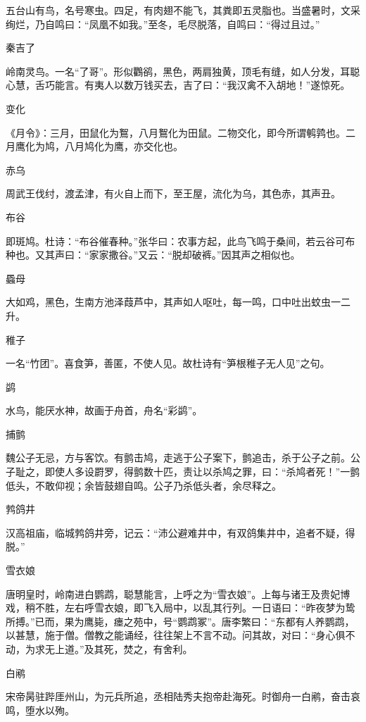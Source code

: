 \documentclass[a4paper,12pt,UTF8,twoside]{ctexbook}
\begin{document}
    五台山有鸟，名号寒虫。四足，有肉翅不能飞，其粪即五灵脂也。当盛暑时，文采绚烂，乃自鸣曰：“凤凰不如我。”至冬，毛尽脱落，自鸣曰：“得过且过。”
    
    秦吉了
    
    岭南灵鸟。一名“了哥”。形似鸜鹆，黑色，两肩独黄，顶毛有缝，如人分发，耳聪心慧，舌巧能言。有夷人以数万钱买去，吉了曰：“我汉禽不入胡地！”遂惊死。
    
    变化
    
    《月令》：三月，田鼠化为鴽，八月鴽化为田鼠。二物交化，即今所谓鹌鹑也。二月鹰化为鸠，八月鸠化为鹰，亦交化也。
    
    赤乌
    
    周武王伐纣，渡孟津，有火自上而下，至王屋，流化为乌，其色赤，其声丑。
    
    布谷
    
    即斑鸠。杜诗：“布谷催春种。”张华曰：农事方起，此鸟飞鸣于桑间，若云谷可布种也。又其声曰：“家家撒谷。”又云：“脱却破裤。”因其声之相似也。
    
    蟁母
    
    大如鸡，黑色，生南方池泽葭芦中，其声如人呕吐，每一鸣，口中吐出蚊虫一二升。
    
    稚子
    
    一名“竹团”。喜食笋，善匿，不使人见。故杜诗有“笋根稚子无人见”之句。
    
    鹢
    
    水鸟，能厌水神，故画于舟首，舟名“彩鹢”。
    
    捕鹯
    
    魏公子无忌，方与客饮。有鹯击鸠，走逃于公子案下，鹯追击，杀于公子之前。公子耻之，即使人多设罻罗，得鹯数十匹，责让以杀鸠之罪，曰：“杀鸠者死！”一鹯低头，不敢仰视；余皆鼓翅自鸣。公子乃杀低头者，余尽释之。
    
    鹁鸽井
    
    汉高祖庙，临城鹁鸽井旁，记云：“沛公避难井中，有双鸽集井中，追者不疑，得脱。”
    
    雪衣娘
    
    唐明皇时，岭南进白鹦鹉，聪慧能言，上呼之为“雪衣娘”。上每与诸王及贵妃博戏，稍不胜，左右呼雪衣娘，即飞入局中，以乱其行列。一日语曰：“昨夜梦为鸷所搏。”已而，果为鹰毙，瘗之苑中，号“鹦鹉冢”。唐李繁曰：“东都有人养鹦鹉，以甚慧，施于僧。僧教之能诵经，往往架上不言不动。问其故，对曰：“身心俱不动，为求无上道。”及其死，焚之，有舍利。
    
    白鹇
    
    宋帝昺驻跸厓州山，为元兵所追，丞相陆秀夫抱帝赴海死。时御舟一白鹇，奋击哀鸣，堕水以殉。
    
\end{document}
